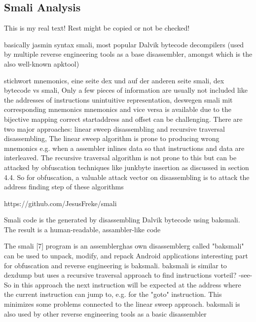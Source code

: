 \subsection{Smali Analysis} \label{subsubsection:tools-baksmali}
This is my real text! Rest might be copied or not be checked!

basically jasmin syntax
%
smali, most popular Dalvik bytecode decompilers (used by multiple reverse engineering tools as a base disassembler, amongst which is the also well-known apktool)
\cite{kovachevaMaster}
%

stichwort mnemonics, eine seite dex und auf der anderen seite smali, dex bytecode vs smali, Only a few pieces of information are usually not included like the addresses of instructions\newline
unintuitive representation, deswegen smali mit corresponding mnemonics\newline
mnemonics and vice versa is available due to the bijective mapping\newline
correct startaddress and offset can be challenging. There are two major approaches: linear sweep disassembling and recursive traversal disassembling, The linear sweep algorithm is prone to producing wrong mnemonics e.g. when a assembler inlines data so that instructions and data are interleaved. The recursive traversal algorithm is not prone to this but can be attacked by obfuscation techniques like junkbyte insertion as discussed in section 4.4. So for obfuscation, a valuable attack vector on disassembling is to attack the address finding step of these algorithms\newline

https://github.com/JesusFreke/smali

Smali code is the generated by disassembling Dalvik bytecode using baksmali. The result is a human-readable, assambler-like code

The smali [7] program is an \gls{assemblerg}has own \gls{disassemblerg} called "baksmali"\newline
can be used to unpack, modify, and repack Android applications\newline
interesting part for obfuscation and reverse engineering is baksmali. baksmali is similar to dexdump but uses a recursive traversal approach to find instructions\newline
vorteil? -see- So in this approach the next instruction will be expected at the address where the current instruction can jump to, e.g. for the "goto" instruction. This minimizes some problems connected to the linear sweep approach. baksmali is also used by other reverse engineering tools as a basic disassembler\newline

